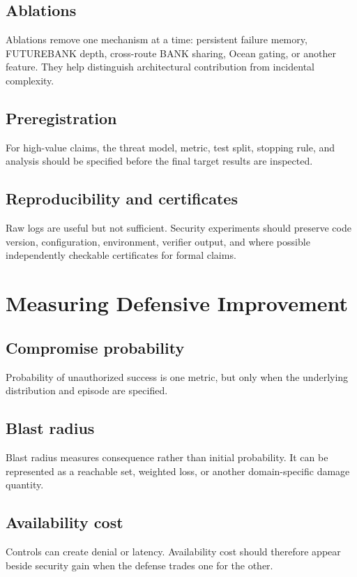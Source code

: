\documentclass[11pt,oneside]{book}
\theoremstyle{definition}
\theoremstyle{remark}
\begin{document}
\section{Ablations}
Ablations remove one mechanism at a time: persistent failure memory, FUTUREBANK depth, cross-route BANK sharing, Ocean gating, or another feature. They help distinguish architectural contribution from incidental complexity.

\section{Preregistration}
For high-value claims, the threat model, metric, test split, stopping rule, and analysis should be specified before the final target results are inspected.

\section{Reproducibility and certificates}
Raw logs are useful but not sufficient. Security experiments should preserve code version, configuration, environment, verifier output, and where possible independently checkable certificates for formal claims.

\chapter{Measuring Defensive Improvement}
\label{ch:measurement}
\section{Compromise probability}
Probability of unauthorized success is one metric, but only when the underlying distribution and episode are specified.

\section{Blast radius}
Blast radius measures consequence rather than initial probability. It can be represented as a reachable set, weighted loss, or another domain-specific damage quantity.

\section{Availability cost}
Controls can create denial or latency. Availability cost should therefore appear beside security gain when the defense trades one for the other.
\end{document}
